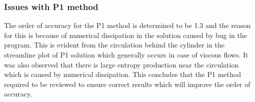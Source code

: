 \documentclass[12pt]{elsarticle}
\begin{document}
	\clearpage
	\subsubsection{Issues with P1 method}
	The order of accuracy for the P1 method is determined to be 1.3  and the reason for this is because of numerical dissipation in the solution caused by bug in the program. This is evident from the circulation behind the cylinder in the streamline plot of P1 solution which generally occurs in case of viscous flows. It was also observed that there is large entropy production near the circulation which is caused by numerical dissipation.  This concludes that the P1 method required to be reviewed to ensure correct results which will improve the order of accuracy. 
	\begin{figure}[ht]
		\centering
		\\

\end{figure}
\end{document}
